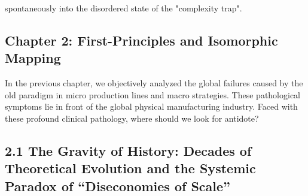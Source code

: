 \documentclass[11pt,a4paper]{article}
\begin{document}
spontaneously into the disordered state of the "complexity trap".

\subsection*{Chapter 2: First-Principles and Isomorphic Mapping}
In the previous chapter, we objectively analyzed the global failures caused by the old paradigm in micro production lines and macro strategies. These pathological symptoms lie in front of the global physical manufacturing industry. Faced with these profound clinical pathology, where should we look for antidote?


\subsection*{2.1 The Gravity of History: Decades of Theoretical Evolution and the Systemic Paradox of “Diseconomies of Scale”}
\end{document}
